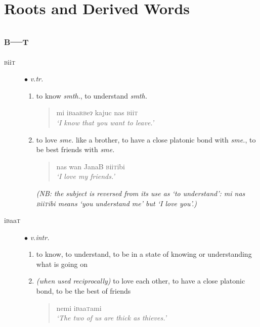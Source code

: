 \documentclass[a4paper,10pt,twoside,openright]{memoir}
\newcommand{\lilglot}{ɂ}
\begin{document}
\chapter{Roots and Derived Words}
\begin{multicols*}{2}
\section{\textsc{b---t}}
\begin{description}
    \item[\textsc{b}ii\textsc{t}] $\bullet$ \textit{v.tr.}\hfill
    \begin{enumerate}
        \item to know \textit{smth.}, to understand \textit{smth.}
        \begin{quote}
            mi i\textsc{b}aa\textsc{rb}e\lilglot{} kajuc nas \textsc{b}ii\textsc{t}\\
            \textit{`I know that you want to leave.'}
        \end{quote}
        \item to love \textit{sme.} like a brother, to have a close platonic bond with \textit{sme.}, to be best friends with \textit{sme.}
        \begin{quote}
            nas wan \textsc{J}ana\textsc{B} \textsc{b}ii\textsc{t}ibi\\
            \textit{`I love my friends.'}
        \end{quote}
        \textit{(NB: the subject is reversed from its use as `to understand': \emph{mi nas \textsc{b}ii\textsc{t}ibi} means `you understand me' but `I love you'.)}
    \end{enumerate}
    \item[i\textsc{b}aa\textsc{t}] $\bullet$ \textit{v.intr.}\hfill
    \begin{enumerate}
        \item to know, to understand, to be in a state of knowing or understanding what is going on
        \item \textit{(when used reciprocally)} to love each other, to have a close platonic bond, to be the best of friends
        \begin{quote}
            nemi i\textsc{b}aa\textsc{t}ami\\
            \textit{`The two of us are thick as thieves.'}
        \end{quote}
    \end{enumerate}
\end{description}


\end{multicols*}
\end{document}
